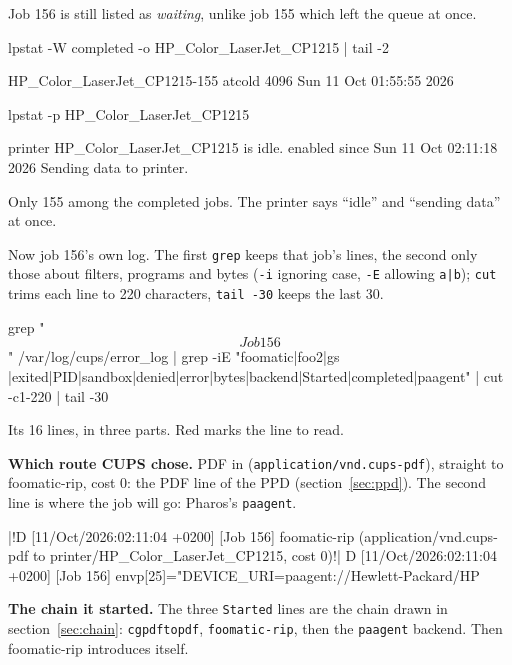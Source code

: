 \documentclass[11pt,a4paper]{article}
\begin{document}
Job 156 is still listed as \emph{waiting}, unlike job 155 which left the queue at once.

\begin{mine}
lpstat -W completed -o HP_Color_LaserJet_CP1215 | tail -2
\end{mine}
\begin{cmdout}
HP_Color_LaserJet_CP1215-155 atcold            4096   Sun 11 Oct 01:55:55 2026
\end{cmdout}
\begin{mine}
lpstat -p HP_Color_LaserJet_CP1215
\end{mine}
\begin{cmdout}
printer HP_Color_LaserJet_CP1215 is idle.  enabled since Sun 11 Oct 02:11:18 2026
	Sending data to printer.
\end{cmdout}

Only 155 among the completed jobs. The printer says ``idle'' and ``sending data'' at once.

Now job 156's own log. The first \texttt{grep} keeps that job's lines, the second only those about filters, programs and bytes (\texttt{-i} ignoring case, \texttt{-E} allowing \texttt{a|b}); \texttt{cut} trims each line to 220 characters, \texttt{tail -30} keeps the last 30.

\begin{mine}
grep "\[Job 156\]" /var/log/cups/error_log | grep -iE "foomatic|foo2|gs |exited|PID|sandbox|denied|error|bytes|backend|Started|completed|paagent" | cut -c1-220 | tail -30
\end{mine}
Its 16 lines, in three parts. Red marks the line to read.

\textbf{Which route CUPS chose.} PDF in (\texttt{application/vnd.cups-pdf}), straight to foomatic-rip, cost 0: the PDF line of the PPD (section~\ref{sec:ppd}). The second line is where the job will go: Pharos's \texttt{paagent}.

\begin{cmdout}
|!D [11/Oct/2026:02:11:04 +0200] [Job 156] foomatic-rip (application/vnd.cups-pdf to printer/HP_Color_LaserJet_CP1215, cost 0)!|
D [11/Oct/2026:02:11:04 +0200] [Job 156] envp[25]="DEVICE_URI=paagent://Hewlett-Packard/HP%
\end{cmdout}

\textbf{The chain it started.} The three \texttt{Started} lines are the chain drawn in section~\ref{sec:chain}: \texttt{cgpdftopdf}, \texttt{foomatic-rip}, then the \texttt{paagent} backend. Then foomatic-rip introduces itself.
\end{document}
